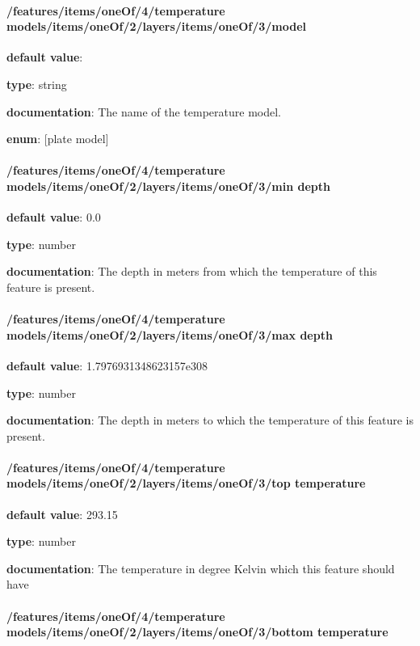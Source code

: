\paragraph{/features/items/oneOf/4/temperature models/items/oneOf/2/layers/items/oneOf/3/model} \begin{itemized}
\item {\bf default value}: 
\item {\bf type}: string
\item {\bf documentation}: The name of the temperature model.
\item {\bf enum}: [plate model]\end{itemized}\paragraph{/features/items/oneOf/4/temperature models/items/oneOf/2/layers/items/oneOf/3/min depth} \begin{itemized}
\item {\bf default value}: 0.0
\item {\bf type}: number
\item {\bf documentation}: The depth in meters from which the temperature of this feature is present.
\end{itemized}\paragraph{/features/items/oneOf/4/temperature models/items/oneOf/2/layers/items/oneOf/3/max depth} \begin{itemized}
\item {\bf default value}: 1.7976931348623157e308
\item {\bf type}: number
\item {\bf documentation}: The depth in meters to which the temperature of this feature is present.
\end{itemized}\paragraph{/features/items/oneOf/4/temperature models/items/oneOf/2/layers/items/oneOf/3/top temperature} \begin{itemized}
\item {\bf default value}: 293.15
\item {\bf type}: number
\item {\bf documentation}: The temperature in degree Kelvin which this feature should have
\end{itemized}\paragraph{/features/items/oneOf/4/temperature models/items/oneOf/2/layers/items/oneOf/3/bottom temperature} \begin{itemized}

\end{itemized}
